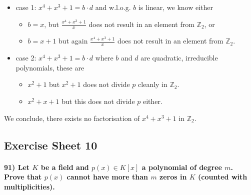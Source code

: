 \documentclass[
]{article}
\providecommand{\tightlist}{%
  \setlength{\itemsep}{0pt}\setlength{\parskip}{0pt}}
\begin{document}
\begin{itemize}
\tightlist
\item
  case 1: \(x^4 +x^3 +1 = b \cdot d\) and w.l.o.g. \(b\) is linear, we
  know either

  \begin{itemize}
  \tightlist
  \item
    \(b = x\), but \(\frac{x^4 +x^3 +1}{x}\) does not result in an
    element from \(\mathbb{Z}_2\), or
  \item
    \(b = x+1\) but again \(\frac{x^4 +x^3 +1}{x}\) does not result in
    an element from \(\mathbb{Z}_2\).
  \end{itemize}
\item
  case 2: \(x^4 +x^3 +1 = b \cdot d\) where \(b\) and \(d\) are
  quadratic, irreducible polynomials, these are

  \begin{itemize}
  \tightlist
  \item
    \(x^2+1\) but \(x^2+1\) does not divide \(p\) cleanly in
    \(\mathbb{Z}_2\).
  \item
    \(x^2+x+1\) but this does not divide \(p\) either.
  \end{itemize}
\end{itemize}

We conclude, there exists no factorisation of \(x^4+x^3+1\) in
\(\mathbb{Z_2}\).

\hypertarget{exercise-sheet-10}{%
\subsection{Exercise Sheet 10}\label{exercise-sheet-10}}

\hypertarget{let-k-be-a-field-and-px-in-kx-a-polynomial-of-degree-m.-prove-that-px-cannot-have-more-than-m-zeros-in-k-counted-with-multiplicities.}{%
\paragraph{\texorpdfstring{91) Let \(K\) be a field and
\(p(x) \in K[x]\) a polynomial of degree \(m\). Prove that \(p(x)\)
cannot have more than \(m\) zeros in \(K\) (counted with
multiplicities).}{91) Let K be a field and p(x) \textbackslash in K{[}x{]} a polynomial of degree m. Prove that p(x) cannot have more than m zeros in K (counted with multiplicities).}}\label{let-k-be-a-field-and-px-in-kx-a-polynomial-of-degree-m.-prove-that-px-cannot-have-more-than-m-zeros-in-k-counted-with-multiplicities.}}
\end{document}
